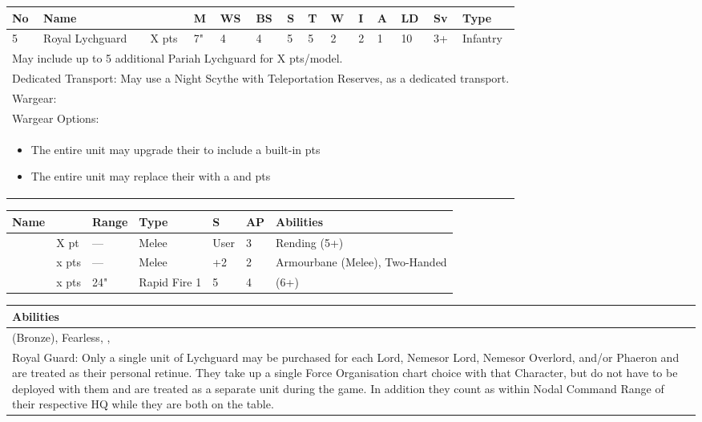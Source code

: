 \newpage
{}

\noindent
\begin{tabular}{||m{10pt} m{95pt} m{30pt} m{11pt} m{11pt} m{11pt} m{11pt} m{11pt} m{11pt} m{11pt} m{11pt} m{11pt} m{11pt} m{125pt}||}
	\hline
	No & Name & & M & WS & BS & S & T & W & I & A & LD & Sv & Type \\
	\hline
	5 & Royal Lychguard & X pts & 7" & 4 & 4 & 5 & 5 & 2 & 2 & 1 & 10 & 3+ & Infantry\\
	\hline
	\hline
	\multicolumn{14}{||Z{532 pt}||}{May include up to 5 additional Pariah Lychguard for X pts/model.}\\	
	\multicolumn{14}{||Z{532 pt}||}{Dedicated Transport: May use a Night Scythe with Teleportation Reserves, as a dedicated transport.}\\	
	\hline
	\hline
	\multicolumn{14}{||Z{532 pt}||}{Wargear: \quickref{Warscythe}}\\
	\multicolumn{14}{||Z{532 pt}||}{Wargear Options:} \\
	\multicolumn{14}{||Z{532 pt}||}{\begin{itemize}
			\item The entire unit may upgrade their \quickref{Warscythe} to include a built-in \quickref{Gauss Blaster} \hrulefill 5 pts
			\item The entire unit may replace their \quickref{Warscythe} with a \quickref{Hyperphase Sword} and \quickref{Dispersion Shield} \hrulefill 10 pts
	\end{itemize}} \\
	\hline
\end{tabular}

\noindent
\begin{tabular}{||m{110pt} m{30pt} m{31pt} m{55pt} m{12pt} m{12pt} m{210pt}||}
	\hline
	Name & & Range & Type & S & AP & Abilities \\
	\hline
	\quickref{Hyperphase Sword} & X pt & — & Melee & User & 3 & Rending (5+) \\
	\quickref{Warscythe} & x pts& — & Melee & +2 & 2 & Armourbane (Melee), Two-Handed \\
	\quickref{Gauss Blaster} & x pts& 24" & Rapid Fire 1 & 5 & 4 & \quickref{Gauss} (6+) \\
	\hline
\end{tabular}

\noindent
\begin{tabular}{||m{532pt}||}
	\hline
	Abilities \\
	\hline
	\quickref{Awakening Protocols} (Bronze), Fearless, \quickref{Living Metal}, \quickref{Reanimation Protocols} \\
	Royal Guard: Only a single unit of Lychguard may be purchased for each Lord, Nemesor Lord, Nemesor Overlord, and/or Phaeron and are treated as their personal retinue. They take up a single Force Organisation chart choice with that Character, but do not have to be deployed with them and are treated as a separate unit during the game. In addition they count as within Nodal Command Range of their respective HQ while they are both on the table. \\
	\hline
\end{tabular}

